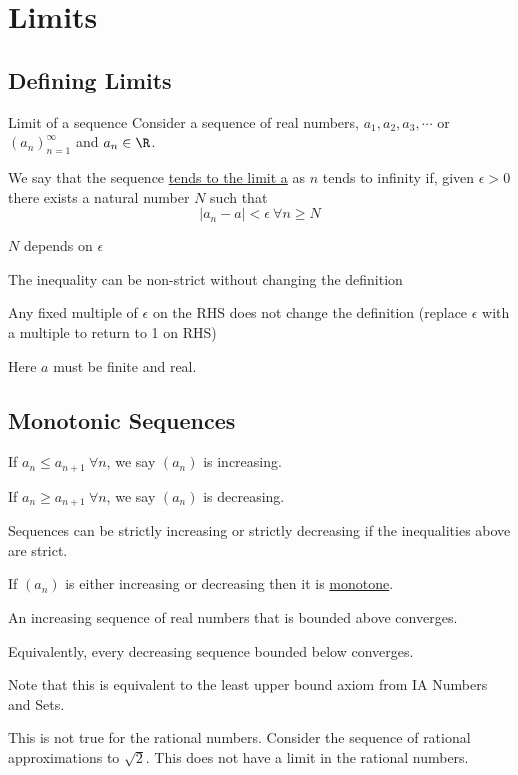 \documentclass[../Main.tex]{subfiles}
\begin{document}
\section{Limits}
\subsection{Defining Limits}
\begin{definition}{Limit of a sequence}
    Consider a sequence of real numbers, $a_1, a_2, a_3, \cdots$ or $(a_n)_{n=1}^\infty$ and $a_n \in \R$.\par
    We say that the sequence \underline{tends to the limit a} as $n$ tends to infinity if, given $\epsilon > 0$ there exists a natural number $N$ such that
    \begin{equation}
        |a_n - a| < \epsilon~\forall n \geq N
        \label{eqnSequenceConvergence}
    \end{equation}
\end{definition}
\begin{remarks}
    \item $N$ depends on $\epsilon$
    \item The inequality can be non-strict without changing the definition
    \item Any fixed multiple of $\epsilon$ on the RHS does not change the definition (replace $\epsilon$ with a multiple to return to 1 on RHS)
    \item Here $a$ must be finite and real.
\end{remarks}
\subsection{Monotonic Sequences}
If $a_n \leq a_{n+1}~\forall n$, we say $(a_n)$ is increasing.\par
If $a_n \geq a_{n+1}~\forall n$, we say $(a_n)$ is decreasing.\par
Sequences can be strictly increasing or strictly decreasing if the inequalities above are strict.\par
If $(a_n)$ is either increasing or decreasing then it is \underline{monotone}.\par
\begin{proposition}
    An increasing sequence of real numbers that is bounded above converges.
\end{proposition}
\begin{remarks}
    \item Equivalently, every decreasing sequence bounded below converges.
    \item Note that this is equivalent to the least upper bound axiom from IA Numbers and Sets.
    \item This is not true for the rational numbers. Consider the sequence of rational approximations to $\sqrt{2}$. This does not have a limit in the rational numbers.
\end{remarks}
\end{document}
